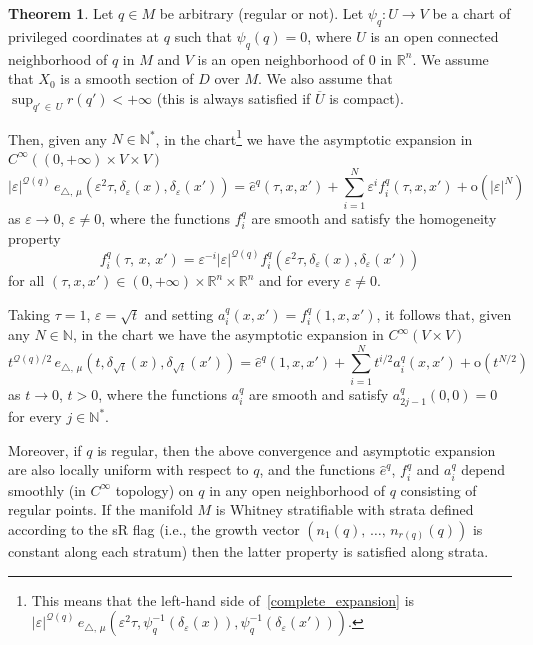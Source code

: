 \documentclass[10pt]{amsart}
\theoremstyle{definition}\newtheorem{defi}[theo]{Definition}\newtheorem{rema}[theo]{Remark}\newtheorem{exam}[theo]{Example}\newtheorem{exem}[theo]{Example}\newtheorem{nota}[theo]{Notation}
\newcommand*\R{\mathbb{R}}
\newcommand*\N{\mathbb{N}}
\newcommand{\calQ}{\mathcal{Q}}
\newcommand{\rmo}{\mathrm{o}}
\newtheorem{theol}{Theorem}
\begin{document}
\begin{theol}\label{main_thm}
Let $q\in M$ be arbitrary (regular or not). Let $\psi_{q}:U\rightarrow V$ be a chart of privileged coordinates at $q$ such that $\psi_{q}(q)=0$, where $U$ is an open connected neighborhood of $q$ in $M$ and $V$ is an open neighborhood of $0$ in $\R^n$. We assume that $X_0$ is a smooth section of $D$ over $M$. We also assume that $\sup_{q'\,\in\,U} r(q')<+\infty$ (this is always satisfied if $\overline U$ is compact).

Then, given any $N\in\N^*$, in the chart\footnote{This means that the left-hand side of~\eqref{complete_expansion} is $\vert\varepsilon\vert^{\calQ(q)}\, e_{\triangle,\,\mu}(\varepsilon^2 \tau,\psi_{q}^{-1}(\delta_\varepsilon(x)),\psi_{q}^{-1}(\delta_\varepsilon(x')))$.} we have the asymptotic expansion in $C^\infty((0,+\infty)\times V\times V)$
\begin{equation}\label{complete_expansion}
\vert\varepsilon\vert^{\calQ(q)}\, e_{\triangle,\,\mu}\left(\varepsilon^2 \tau,\delta_\varepsilon(x),\delta_\varepsilon(x')\right) = \widehat{e}^{q}(\tau,x,x') + \sum_{i=1}^N \varepsilon^i f^{q}_i(\tau,x,x') + \rmo\left(\vert\varepsilon\vert^N\right)
\end{equation}
as $\varepsilon\rightarrow 0$, $\varepsilon\neq 0$, where the functions $f^{q}_i$ are smooth and satisfy the homogeneity property
\[
f^{q}_i(\tau,\,x,\,x') = \varepsilon^{-i} \vert\varepsilon\vert^{\calQ(q)} f^{q}_i\left(\varepsilon^2 \tau,\delta_\varepsilon(x),\delta_\varepsilon(x')\right)
\]
for all $(\tau,x,x')\in(0,+\infty)\times\R^n\times\R^n$ and for every $\varepsilon\neq 0$.

Taking $\tau=1$, $\varepsilon=\sqrt{t}$ and setting $a_i^{q}(x,x')=f^{q}_i(1,x,x')$, it follows that, given any $N\in\N$, in the chart we have the asymptotic expansion in $C^\infty(V\times V)$
\begin{equation}\label{complete_expansion_1}
t^{\calQ(q)/2}\, e_{\triangle,\,\mu}\left(t,\delta_{\sqrt{t}}(x),\delta_{\sqrt{t}}(x')\right) = \widehat{e}^{q}(1,x,x') + \sum_{i=1}^N t^{i/2} a_i^{q}(x,x') + \rmo\left(t^{N/2}\right)
\end{equation}
as $t\rightarrow 0$, $t>0$, where the functions $a_i^{q}$ are smooth and satisfy $a_{2j-1}^{q}(0,0)=0$ for every $j\in\N^*$.

Moreover, if $q$ is regular, then the above convergence and asymptotic expansion are also locally uniform with respect to $q$, and the functions $\widehat{e}^{q}$, $f^{q}_i$ and $a_i^{q}$ depend smoothly (in $C^\infty$ topology) on $q$ in any open neighborhood of $q$ consisting of regular points. If the manifold $M$ is Whitney stratifiable with strata defined according to the sR flag (i.e., the growth vector $(n_1(q),\,\ldots,\,n_{r(q)}(q))$ is constant along each stratum) then the latter property is satisfied along strata. 
\end{theol}
\end{document}
